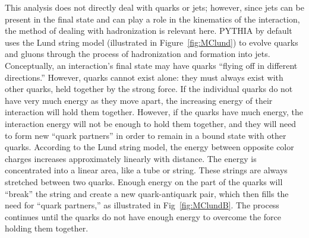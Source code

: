 This analysis does not directly deal with 
quarks or jets; 
however, since jets can be present in the final state 
and can play a role in the kinematics of the \Zee 
interaction, 
the method of dealing with hadronization 
is relevant here.  
PYTHIA by default uses the Lund string model 
\cite{LundString} 
(illustrated in Figure~\ref{fig:MClund})
to evolve 
quarks and gluons through the process of hadronization 
and formation into jets. %
Conceptually, an interaction's final state may have 
quarks 
``flying off in different directions.''  
However, quarks cannot exist alone: %
they must always exist with other quarks, 
held together by the strong force.  
If the individual quarks do not have very much energy 
as they move apart, 
the increasing energy of their interaction 
will hold them together.  %
However, if the quarks have much energy, 
the interaction energy will not be enough to hold 
them together, 
and they will need to form new ``quark partners'' 
in order to 
remain in a bound state with other quarks.  
According to the Lund string model, 
the energy between opposite color charges 
increases approximately linearly with distance. 
The energy is concentrated into a linear area, 
like a tube or string.  
These strings are always stretched between two quarks.  
Enough energy on the part of the quarks will 
``break'' the string and 
create a new quark-antiquark pair, 
which then fills the need for ``quark partners,'' 
as illustrated in Fig~\ref{fig:MClundB}.  
The process continues until the quarks 
do not have enough energy to overcome 
the force holding them together.  %

